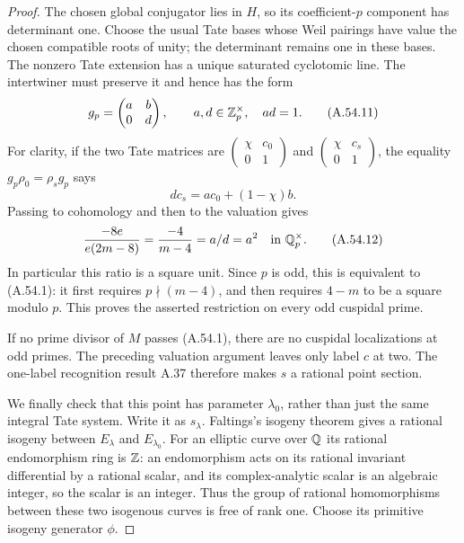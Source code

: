 \begin{proof}
The chosen global conjugator lies in $H$, so its coefficient-$p$
component has determinant one.  Choose the usual Tate bases
whose Weil pairings have value the chosen compatible roots
of unity; the determinant remains one in these bases.
The nonzero Tate extension has a unique saturated cyclotomic
line.  The intertwiner must preserve it and hence has the form
\[
                        g_p=\begin{pmatrix}a&b\\0&d\end{pmatrix},
                 \qquad a,d\in\mathbb Z_p^\times,\quad ad=1.
\tag{A.54.11}
\]
For clarity, if the two Tate matrices are
$\left(\begin{smallmatrix}\chi&c_0\\0&1\end{smallmatrix}\right)$
and $\left(\begin{smallmatrix}\chi&c_s\\0&1\end{smallmatrix}\right)$,
the equality $g_p\rho_0=\rho_s g_p$ says
\[
                     d c_s=a c_0+(1-\chi)b.
\]
Passing to cohomology and then to the valuation gives
\[
       \frac{-8e}{e(2m-8)}
          =\frac{-4}{m-4}=a/d=a^2
                         \quad\hbox{in }\mathbb Q_p^\times.
\tag{A.54.12}
\]
In particular this ratio is a square unit.  Since $p$ is odd,
this is equivalent to (A.54.1): it first requires
$p\nmid(m-4)$, and then requires $4-m$ to be a square modulo
$p$.  This proves the asserted restriction on every odd
cuspidal prime.

If no prime divisor of $M$ passes (A.54.1), there are no
cuspidal localizations at odd primes.  The preceding valuation
argument leaves only label $c$ at two.  The one-label recognition
result A.37 therefore makes $s$ a rational point section.

We finally check that this point has parameter $\lambda_0$,
rather than just the same integral Tate system.  Write it as
$s_\lambda$.  Faltings's isogeny theorem gives a rational
isogeny between $E_\lambda$ and $E_{\lambda_0}$.
For an elliptic curve over $\mathbb Q$ its rational endomorphism
ring is $\mathbb Z$: an endomorphism acts on its rational invariant
differential by a rational scalar, and its complex-analytic
scalar is an algebraic integer, so the scalar is an integer.
Thus the group of rational homomorphisms between these two
isogenous curves is free of rank one.  Choose its primitive
isogeny generator $\phi$.


\end{proof}

